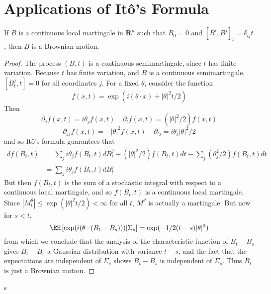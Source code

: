 \section{Applications of It\^{o}'s Formula}

\begin{theorem}
    If $B$ is a continuous local martingale in $\mathbf{R}^n$ such that $B_0 = 0$ and $[B^i,B^j]_t = \delta_{ij} t$, then $B$ is a Brownian motion.
\end{theorem}
\begin{proof}
    The process $(B,t)$ is a continuous semimartingale, since $t$ has finite variation. Because $t$ has finite variation, and $B$ is a continuous semimartingale, $[B_t^j,t] = 0$ for all coordinates $j$. For a fixed $\theta$, consider the function
    \[ f(x,t) = \exp(i (\theta \cdot x) + |\theta|^2 t/2) \]
    Then
    \[ \partial_j f(x,t) = i \theta_j f(x,t)\ \ \ \ \ \partial_t f(x,t) = (|\theta|^2/2) f(x,t) \]
    \[ \partial_{jj} f(x,t) = - |\theta|^2 f(x,t)\ \ \ \ \ \partial_{tj} = i \theta_j |\theta|^2/2 \]
    and so It\^{o}'s formula guarantees that
    \begin{align*}
        df(B_t,t) &= \sum_j i \theta_j f(B_t,t) dB_t^j + (|\theta|^2/2) f(B_t,t) dt - \sum_j (\theta_j^2/2) f(B_t,t) dt\\
        &= \sum_j i \theta_j f(B_t,t) dB_t^j
    \end{align*}
    But then $f(B_t,t)$ is the sum of a stochastic integral with respect to a continuous local martingale, and so $f(B_t,t)$ is a continuous local martingale. Since $|M_t^\theta| \leq \exp(|\theta|^2 t/2) < \infty$ for all $t$, $M^\theta$ is actually a martingale. But now for $s < t$,
    \[ \EE \left[ \exp(i (\theta \cdot (B_t - B_s))) | \Sigma_s \right] = \exp(-1/2 (t - s) |\theta|^2) \]
    from which we conclude that the analysis of the characteristic function of $B_t - B_s$ gives $B_t - B_s$ a Gaussian distribution with variance $t - s$, and the fact that the expectations are independent of $\Sigma_s$ shows $B_t - B_s$ is independent of $\Sigma_s$. Thus $B_t$ is just a Brownian motion.
\end{proof}

s


















